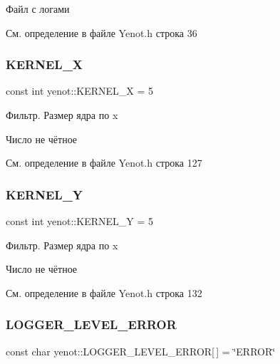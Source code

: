 Файл с логами 



См. определение в файле Yenot.\+h строка 36

\mbox{\label{namespaceyenot_aa753d0e3e99fb4b37b3930996bdfe563}} 
\subsubsection{\texorpdfstring{K\+E\+R\+N\+E\+L\+\_\+X}{KERNEL\_X}}
{\footnotesize\ttfamily const int yenot\+::\+K\+E\+R\+N\+E\+L\+\_\+X = 5}

Фильтр. Размер ядра по x

Число не чётное 

См. определение в файле Yenot.\+h строка 127

\mbox{\label{namespaceyenot_a33a5af73a30e2b5684ee02cc4bf4c374}} 
\subsubsection{\texorpdfstring{K\+E\+R\+N\+E\+L\+\_\+Y}{KERNEL\_Y}}
{\footnotesize\ttfamily const int yenot\+::\+K\+E\+R\+N\+E\+L\+\_\+Y = 5}

Фильтр. Размер ядра по x

Число не чётное 

См. определение в файле Yenot.\+h строка 132

\mbox{\label{namespaceyenot_a08c0d88b074bcba3b7d79d019211a1ac}} 
\subsubsection{\texorpdfstring{L\+O\+G\+G\+E\+R\+\_\+\+L\+E\+V\+E\+L\+\_\+\+E\+R\+R\+OR}{LOGGER\_LEVEL\_ERROR}}
{\footnotesize\ttfamily const char yenot\+::\+L\+O\+G\+G\+E\+R\+\_\+\+L\+E\+V\+E\+L\+\_\+\+E\+R\+R\+OR\mbox{[}$\,$\mbox{]} = \char`\"{}E\+R\+R\+OR\char`\"{}}



